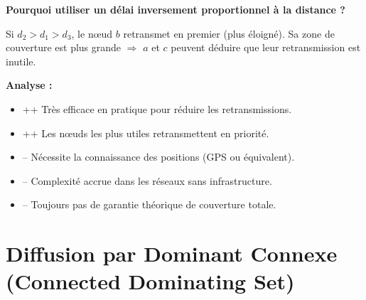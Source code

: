 \documentclass[12pt,a4paper]{article}
\begin{document}
\begin{astuce}
\textbf{Pourquoi utiliser un délai inversement proportionnel à la distance ?}

\begin{center}
\end{center}

Si $d_2 > d_1 > d_3$, le nœud $b$ retransmet en premier (plus éloigné). Sa zone de couverture
est plus grande $\Rightarrow$ $a$ et $c$ peuvent déduire que leur retransmission est inutile.
\end{astuce}

\begin{important}
\textbf{Analyse :}

\begin{itemize}
    \item \textcolor{defvert}{++} Très efficace en pratique pour réduire les retransmissions.
    \item \textcolor{defvert}{++} Les nœuds les plus utiles retransmettent en priorité.
    \item \textcolor{importantrouge}{--} Nécessite la connaissance des positions (GPS ou équivalent).
    \item \textcolor{importantrouge}{--} Complexité accrue dans les réseaux sans infrastructure.
    \item \textcolor{importantrouge}{--} Toujours pas de garantie théorique de couverture totale.
\end{itemize}
\end{important}

\newpage

\section{Diffusion par Dominant Connexe (Connected Dominating Set)}
\end{document}
